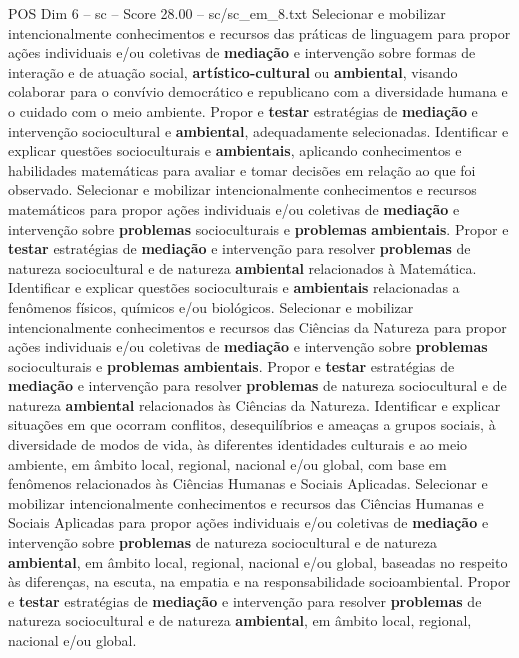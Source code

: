 \begin{textsample}{POS Dim 6 – sc – Score 28.00 – sc/sc\_em\_8.txt}
Selecionar e mobilizar intencionalmente conhecimentos e recursos das práticas de linguagem para propor ações individuais e/ou coletivas de \textbf{mediação} e intervenção sobre formas de interação e de atuação social, \textbf{artístico-cultural} ou \textbf{ambiental}, visando colaborar para o convívio democrático e republicano com a diversidade humana e o cuidado com o meio ambiente.
Propor e \textbf{testar} estratégias de \textbf{mediação} e intervenção sociocultural e \textbf{ambiental}, adequadamente selecionadas.
Identificar e explicar questões socioculturais e \textbf{ambientais}, aplicando conhecimentos e habilidades matemáticas para avaliar e tomar decisões em relação ao que foi observado.
Selecionar e mobilizar intencionalmente conhecimentos e recursos matemáticos para propor ações individuais e/ou coletivas de \textbf{mediação} e intervenção sobre \textbf{problemas} socioculturais e \textbf{problemas} \textbf{ambientais}.
Propor e \textbf{testar} estratégias de \textbf{mediação} e intervenção para resolver \textbf{problemas} de natureza sociocultural e de natureza \textbf{ambiental} relacionados à Matemática.
Identificar e explicar questões socioculturais e \textbf{ambientais} relacionadas a fenômenos físicos, químicos e/ou biológicos.
Selecionar e mobilizar intencionalmente conhecimentos e recursos das Ciências da Natureza para propor ações individuais e/ou coletivas de \textbf{mediação} e intervenção sobre \textbf{problemas} socioculturais e \textbf{problemas} \textbf{ambientais}.
Propor e \textbf{testar} estratégias de \textbf{mediação} e intervenção para resolver \textbf{problemas} de natureza sociocultural e de natureza \textbf{ambiental} relacionados às Ciências da Natureza.
Identificar e explicar situações em que ocorram conflitos, desequilíbrios e ameaças a grupos sociais, à diversidade de modos de vida, às diferentes identidades culturais e ao meio ambiente, em âmbito local, regional, nacional e/ou global, com base em fenômenos relacionados às Ciências Humanas e Sociais Aplicadas.
Selecionar e mobilizar intencionalmente conhecimentos e recursos das Ciências Humanas e Sociais Aplicadas para propor ações individuais e/ou coletivas de \textbf{mediação} e intervenção sobre \textbf{problemas} de natureza sociocultural e de natureza \textbf{ambiental}, em âmbito local, regional, nacional e/ou global, baseadas no respeito às diferenças, na escuta, na empatia e na responsabilidade socioambiental.
Propor e \textbf{testar} estratégias de \textbf{mediação} e intervenção para resolver \textbf{problemas} de natureza sociocultural e de natureza \textbf{ambiental}, em âmbito local, regional, nacional e/ou global.

\end{textsample}

